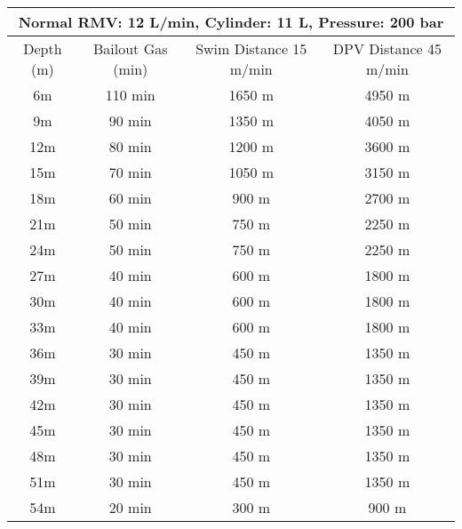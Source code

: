 \documentclass{article}
\begin{document}
\begin{tabular}{|c|c|c|c|}
\hline
\multicolumn{4}{|c|}{Normal RMV: 12 L/min, Cylinder: 11 L, Pressure: 200 bar} \\ 
\hline
Depth (m) & Bailout Gas (min) & Swim Distance 15 m/min & DPV Distance 45 m/min \\ 
\hline
6m & 110 min & 1650 m & 4950 m \\ 
\hline
9m & 90 min & 1350 m & 4050 m \\ 
\hline
12m & 80 min & 1200 m & 3600 m \\ 
\hline
15m & 70 min & 1050 m & 3150 m \\ 
\hline
18m & 60 min & 900 m & 2700 m \\ 
\hline
21m & 50 min & 750 m & 2250 m \\ 
\hline
24m & 50 min & 750 m & 2250 m \\ 
\hline
27m & 40 min & 600 m & 1800 m \\ 
\hline
30m & 40 min & 600 m & 1800 m \\ 
\hline
33m & 40 min & 600 m & 1800 m \\ 
\hline
36m & 30 min & 450 m & 1350 m \\ 
\hline
39m & 30 min & 450 m & 1350 m \\ 
\hline
42m & 30 min & 450 m & 1350 m \\ 
\hline
45m & 30 min & 450 m & 1350 m \\ 
\hline
48m & 30 min & 450 m & 1350 m \\ 
\hline
51m & 30 min & 450 m & 1350 m \\ 
\hline
54m & 20 min & 300 m & 900 m \\ 
\hline
\end{tabular}
\vspace{12pt}
\end{document}
